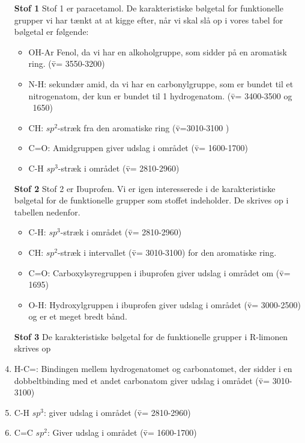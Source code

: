 \begin{enumerate}
\item[\textbf{Stof 1}] 
Stof 1 er paracetamol. De karakteristiske bølgetal for funktionelle grupper vi har tænkt at at kigge efter, når vi skal slå op i vores tabel for bølgetal er følgende: 
\begin{itemize}
\item OH-Ar Fenol, da vi har en alkoholgruppe, som sidder på en aromatisk ring. (\={v}= 3550-3200)

\item N-H: sekundær amid, da vi har en carbonylgruppe, som er bundet til et nitrogenatom, der kun er bundet til 1 hydrogenatom. (\={v}= 3400-3500 og ~1650)

\item CH: $sp^2$-stræk fra den aromatiske ring (\={v}=3010-3100 )

\item C=O: Amidgruppen giver udslag i området (\={v}= 1600-1700)

\item C-H $sp^3$-stræk i området (\={v}= 2810-2960)
\end{itemize}

\item[\textbf{Stof 2}]
Stof 2 er Ibuprofen. Vi er igen interesserede i de karakteristiske bølgetal for de funktionelle grupper som stoffet indeholder. De skrives op i tabellen nedenfor. 

\begin{itemize}
\item C-H: $sp^3$-stræk i området (\={v}= 2810-2960)

\item CH: $sp^2$-stræk i intervallet (\={v}= 3010-3100) for den aromatiske ring. 

\item C=O: Carboxylsyregruppen i ibuprofen giver udslag i området om (\={v}= 1695)

\item O-H: Hydroxylgruppen i ibuprofen giver udslag i området (\={v}= 3000-2500) og er et meget bredt bånd. 
\end{itemize}
\item[\textbf{Stof 3}]
De karakteristiske bølgetal for de funktionelle grupper i R-limonen skrives op

\item H-C=: Bindingen mellem hydrogenatomet og carbonatomet, der sidder i en dobbeltbinding med et andet carbonatom giver udslag i området (\={v}=  3010-3100)

\item C-H $sp^3$: giver udslag i området (\={v}= 2810-2960)

\item C=C $sp^2$: Giver udslag i området (\={v}= 1600-1700)
\end{enumerate}

